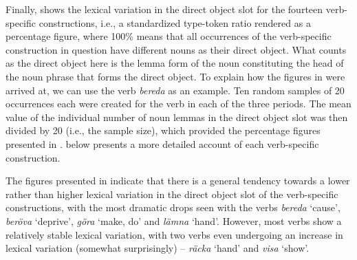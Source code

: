 \documentclass[output=paper]{langscibook}
\begin{document}
Finally,  shows the lexical variation in the direct object slot for the fourteen verb-specific constructions, i.e., a standardized type-token ratio rendered as a percentage figure, where 100\% means that all occurrences of the verb-specific construction in question have different nouns as their direct object. What counts as the direct object here is the lemma form of the noun constituting the head of the noun phrase that forms the direct object. To explain how the figures in  were arrived at, we can use the verb \textit{bereda} as an example. Ten random samples of 20 occurrences each were created for the verb in each of the three periods. The mean value of the individual number of noun lemmas in the direct object slot was then divided by 20 (i.e., the sample size), which provided the percentage figures presented in .  below presents a more detailed account of each verb-specific construction.



The figures presented in  indicate that there is a general tendency towards a lower rather than higher lexical variation in the direct object slot of the verb-specific constructions, with the most dramatic drops seen with the verbs \textit{bereda} ‘cause’, \textit{beröva} ‘deprive’, \textit{göra} ‘make, do’ and \textit{lämna} ‘hand’. However, most verbs show a relatively stable lexical variation, with two verbs even undergoing an increase in lexical variation (somewhat surprisingly) – \textit{räcka} ‘hand’ and \textit{visa} ‘show’.
\end{document}
